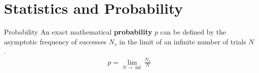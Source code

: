\chapter{Statistics and Probability}
\thispagestyle{fancy}

\begin{defn}[Probability]{Probability}
	An exact mathematical \textbf{probability} $p$ can be defined by the asymptotic frequency of successes $N_s$ in the limit of an infinite number of trials $N$.
 \begin{align}
  p = \lim_{N\rightarrow\inf}\frac{N_s}{N}
 \end{align}
\end{defn}
